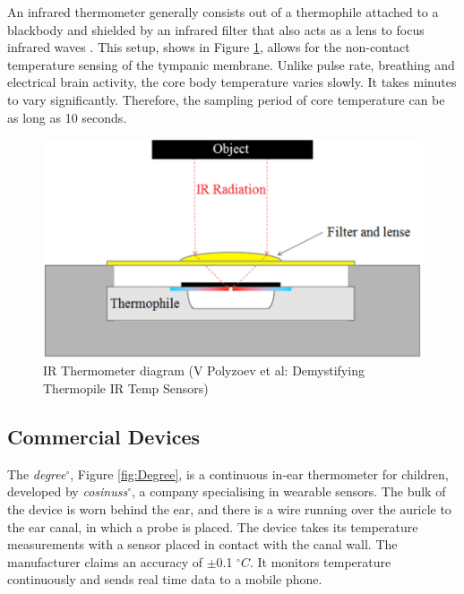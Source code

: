 An infrared thermometer generally consists out of a thermophile attached to a blackbody and shielded by an infrared filter that also acts as a lens to focus infrared waves \citep{irTempSensors}. This setup, shows in Figure \ref{fig:IR_Thermometer}, allows for the non-contact temperature sensing of the tympanic membrane. Unlike pulse rate, breathing and electrical brain activity, the core body temperature varies slowly. It takes minutes to vary significantly. Therefore, the sampling period of core temperature can be as long as 10 seconds.

\medskip

\begin{figure}[h]
   \centering
   \includegraphics[scale=0.5]{figs/IR_Thermometer}
   \caption{IR Thermometer diagram (V Polyzoev et al: Demystifying Thermopile IR Temp Sensors)}
   \label{fig:IR_Thermometer}
\end{figure}

\subsection{Commercial Devices}
The \textit{degree}$^{\circ}$, Figure \ref{fig:Degree}, is a continuous in-ear thermometer for children, developed by \textit{cosinuss}$^{\circ}$, a company specialising in wearable sensors. The bulk of the device is worn behind the ear, and there is a wire running over the auricle to the ear canal, in which a probe is placed. The device takes its temperature measurements with a sensor placed in contact with the canal wall. The manufacturer claims an accuracy of $\pm$0.1 $^{\circ}C$. It monitors temperature continuously and sends real time data to a mobile phone.

\medskip

